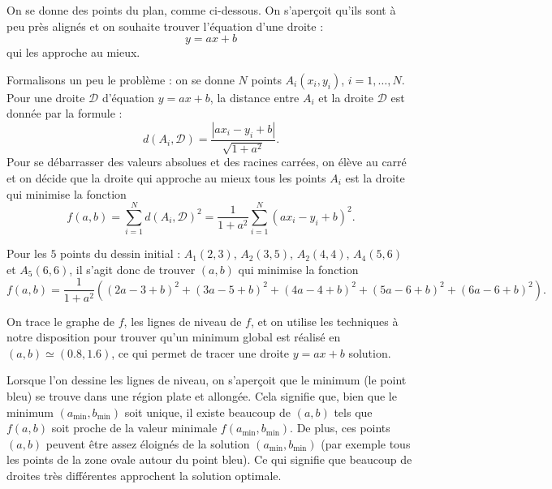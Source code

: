 \documentclass[11pt,class=report,crop=false]{standalone}
\begin{document}
\begin{exemple}
On se donne des points du plan, comme ci-dessous. On s'aperçoit qu'ils sont à peu près alignés et on souhaite trouver l'équation d'une droite :
$$y= a x + b$$ 
qui les approche au mieux.


   

Formalisons un peu le problème : on se donne $N$ points $A_i(x_i,y_i)$, $i=1,\ldots,N$. Pour une droite $\mathcal{D}$ d'équation $y=ax+b$, la distance entre $A_i$ et la droite $\mathcal{D}$ est donnée par la formule :
$$d(A_i,\mathcal{D}) = \frac{|ax_i-y_i+b|}{\sqrt{1+a^2}}.$$
Pour se débarrasser des valeurs absolues et des racines carrées, on élève au carré et on décide que la droite qui approche au mieux tous les points $A_i$ est la droite qui minimise la fonction 
$$f(a,b) = \sum_{i=1}^{N} d(A_i,\mathcal{D})^2 = 
\frac{1}{1+a^2} \sum_{i=1}^{N}  (ax_i-y_i+b)^2.$$

Pour les $5$ points du dessin initial : $A_1(2,3)$, $A_2(3,5)$, 
 $A_2(4,4)$, $A_4(5,6)$ et $A_5(6,6)$, il s'agit donc de trouver $(a,b)$ qui minimise la fonction 
 $$f(a,b) = \frac{1}{1+a^2} \left( 
 (2a-3+b)^2 + (3a-5+b)^2 + (4a-4+b)^2 + (5a-6+b)^2 + (6a-6+b)^2 \right).$$

 
On trace le graphe de $f$, les lignes de niveau de $f$, et on utilise les techniques à notre disposition pour trouver qu'un minimum global est réalisé en $(a,b) \simeq (0.8,1.6)$, ce qui permet de tracer une droite $y=ax+b$ solution.
 

Lorsque l'on dessine les lignes de niveau, on s'aperçoit que le minimum (le point bleu) se trouve dans une région plate et allongée. Cela signifie que, bien que le minimum $(a_{\min},b_{\min})$ soit unique, il existe beaucoup de $(a,b)$ tels que $f(a,b)$ soit proche de la valeur minimale $f(a_{\min},b_{\min})$. De plus, ces points $(a,b)$ peuvent être assez éloignés de la solution $(a_{\min},b_{\min})$ (par exemple tous les points de la zone ovale autour du point bleu). Ce qui signifie que beaucoup de droites très différentes approchent la solution optimale.



\end{exemple}
\end{document}
